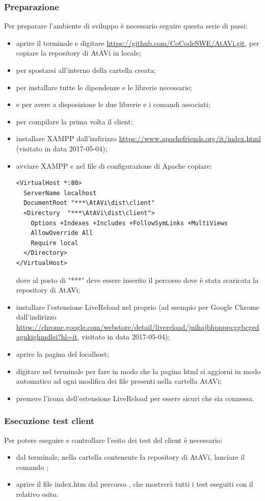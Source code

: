 \subsubsection{Preparazione}
Per preparare l'ambiente di sviluppo è necessario seguire questa serie di passi:
\begin{itemize}
	\item aprire il terminale e digitare  \url{https://github.com/CoCodeSWE/AtAVi.git}, per copiare la repository di AtAVi in locale;
	\item {} per spostarsi all'interno della cartella creata;
	\item {} per installare tutte le dipendenze e le librerie necessarie;
	\item {} e  per avere a disposizione le due librerie e i comandi associati;
	\item {} per compilare la prima volta il client;
	\item installare XAMPP dall'indirizzo \url{https://www.apachefriends.org/it/index.html} (visitato in data 2017-05-04);
	\item avviare XAMPP e nel file di configurazione di Apache copiare: \\
\begin{lstlisting}
<VirtualHost *:80>
  ServerName localhost
  DocumentRoot "***\AtAVi\dist\client"
  <Directory  "***\AtAVi\dist\client">
    Options +Indexes +Includes +FollowSymLinks +MultiViews
    AllowOverride All
    Require local
  </Directory>
</VirtualHost>
\end{lstlisting}
dove al posto di "***" deve essere inserito il percorso dove è stata scaricata la repository di AtAVi;
	\item installare l'estensione LiveReload nel proprio  (ad esempio per Google Chrome dall'indirizzo \url{https://chrome.google.com/webstore/detail/livereload/jnihajbhpnppcggbcgedagnkighmdlei?hl=it}, visitato in data 2017-05-04);
	\item aprire la pagina del localhost;
	\item digitare  nel terminale per fare in modo che la pagina html si aggiorni in modo automatico ad ogni modifica dei file presenti nella cartella AtAVi;
	\item premere l'icona dell'estensione LiveReload per essere sicuri che sia connessa.
\end{itemize}
\subsubsection{Esecuzione test client}
Per potere eseguire e controllare l'esito dei test del client è necessario:
\begin{itemize}
	\item dal terminale, nella cartella contenente la repository di AtAVi, lanciare il comando ;
	\item aprire il file index.htm dal percorso , che mostrerà tutti i test eseguiti con il relativo esito.
\end{itemize}
